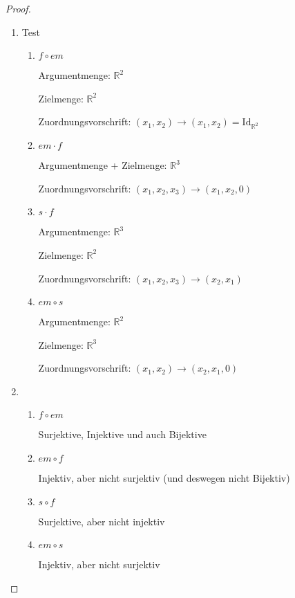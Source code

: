 \documentclass[prb,12pt]{revtex4-2}
\theoremstyle{definition}
\theoremstyle{definition}
\newenvironment{parts}{\begin{enumerate}[label=(\alph*)]}{\end{enumerate}}
\newcommand{\R}{\mathbb{R}}
\begin{document}
\begin{proof}
	\begin{parts}
	\item Test
		\begin{enumerate}[label=(\roman*)]
			\item $f\circ em$


				Argumentmenge: $\R^2$

				Zielmenge: $\R^2$

				Zuordnungsvorschrift:  $(x_1,x_2)\to (x_1,x_2)=\text{Id}_{\R^2}$

			\item $em \cdot f$

				Argumentmenge + Zielmenge:  $\R^3$ 

				Zuordnungsvorschrift: $(x_1,x_2,x_3)\to (x_1,x_2,0)$ 

			\item $s\cdot f$ 

				Argumentmenge: $\R^3$ 

				Zielmenge: $\R^2$ 

				Zuordnungsvorschrift: $(x_1,x_2,x_3)\to (x_2,x_1)$
			\item $em\circ s$

				Argumentmenge:  $\R^2$

				Zielmenge:  $\R^3$

				Zuordnungsvorschrift:  $(x_1,x_2)\to (x_2,x_1,0)$
		\end{enumerate}
		\item
			\begin{enumerate}[label=(\roman*)]
				\item $f\circ em$

					Surjektive, Injektive und auch Bijektive

				\item $em\circ f$ 

					Injektiv, aber nicht surjektiv (und deswegen nicht Bijektiv)

				\item $s\circ f$ 

					Surjektive, aber nicht injektiv

				\item $em\circ s$ 

					Injektiv, aber nicht surjektiv
			\end{enumerate}
	\end{parts}
\end{proof}
\end{document}
